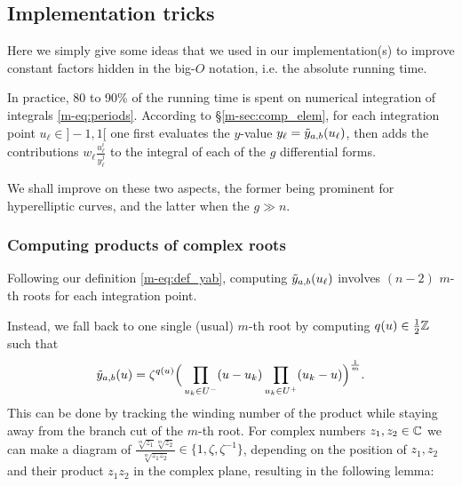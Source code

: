 \documentclass[main.tex]{subfiles}
\begin{document}
   \subsection{Implementation tricks}

   Here we simply give some ideas that we used in our implementation(s) to improve constant factors hidden in the big-$O$ notation, i.e. the absolute running time.

   In practice, 80 to 90\% of the running time is spent on numerical integration
   of integrals \eqref{m-eq:periods}. According to \S\ref{m-sec:comp_elem},
   for each integration point $u_\ell\in]-1,1[$ one first evaluates the $y$-value
   $y_\ell=\tilde{y}_{a,b}(u_\ell)$, then adds the contributions $w_\ell\frac{u_\ell^i}{y_\ell^j}$ to
   the integral of each of the $g$ differential forms.

   We shall improve on these two aspects, the former being prominent for hyperelliptic curves,
   and the latter when the $g \gg n$.

    \subsubsection{Computing products of complex roots}\label{subsec:computing_roots}

    Following our definition \eqref{m-eq:def_yab}, computing $\tilde{y}_{a,b}(u_\ell)$ involves
    $(n-2)$ $m$-th roots for each integration point.

    Instead, we fall back to one single (usual) $m$-th root
    by computing $q(u)\in\frac12\mathbb{Z}$ such that
  \begin{equation}
      \label{eq:ytab_comp}
      \tilde{y}_{a,b}(u) = \zeta^{q(u)} \Big( \prod_{u_k\in U^-}(u-u_k) \prod_{u_k\in U^+} (u_k-u) \Big)^{\frac{1}{m}}.
  \end{equation}
  This can be done by tracking
  the winding number of the product while staying away from the branch cut
  of the $m$-th root.
  For complex numbers $z_1,z_2 \in \mathbb{C}$ we can make a diagram of
  $\frac{\sqrt[m]{z_1}\sqrt[m]{z_2}}{\sqrt[m]{z_1z_2}} \in \{ 1, \zeta,
  \zeta^{-1} \}$, depending on the position of $z_1,z_2$ and their product
  $z_1z_2$ in the complex plane, resulting in the following lemma:
\end{document}
